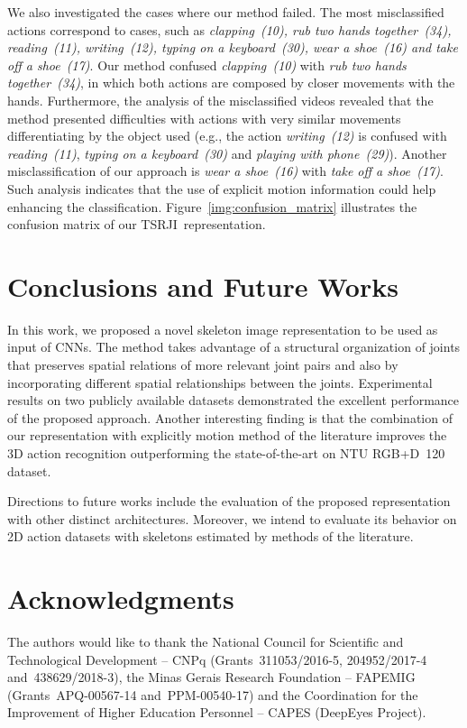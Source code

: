 \documentclass[10pt,conference]{IEEEtran}
\def\sigla{TSRJI}
\begin{document}
We also investigated the cases where our method failed. The most misclassified actions correspond to cases, such as \emph{clapping~(10), rub two hands together~(34), reading~(11), writing~(12), typing on a keyboard~(30), wear a shoe~(16) and take off a shoe~(17)}. Our method confused \emph{clapping~(10)} with \emph{rub two hands together~(34)}, in which both actions are composed by closer movements with the hands. Furthermore, the analysis of the misclassified videos revealed that the method presented difficulties with actions with very similar movements differentiating by the object used (e.g., the action \emph{writing~(12)} is confused with \emph{reading~(11)}, \emph{typing on a keyboard~(30)} and \emph{playing with phone~(29)}). Another misclassification of our approach is \emph{wear a shoe~(16)} with \emph{take off a shoe~(17)}. Such analysis indicates that the use of explicit motion information could help enhancing the classification. Figure~\ref{img:confusion_matrix} illustrates the confusion matrix of our \sigla~representation. 

\section{Conclusions and Future Works}\label{conclusions}

In this work, we proposed a novel skeleton image representation to be used as input of CNNs. The method takes advantage of a structural organization of joints that preserves spatial relations of more relevant joint pairs and also by incorporating different spatial relationships between the joints. Experimental results on two publicly available datasets demonstrated the excellent performance of the proposed approach. Another interesting finding is that the combination of our representation with explicitly motion method of the literature improves the 3D action recognition outperforming the state-of-the-art on NTU RGB+D~120 dataset.

Directions to future works include the evaluation of the proposed representation with other distinct architectures. Moreover, we intend to evaluate its behavior on 2D action datasets with skeletons estimated by methods of the literature.

\section*{Acknowledgments}

The authors would like to thank the National Council for Scientific and Technological Development -- CNPq (Grants~311053/2016-5, 204952/2017-4 and~438629/2018-3), the Minas Gerais Research Foundation -- FAPEMIG (Grants~APQ-00567-14 and~PPM-00540-17) and the Coordination for the Improvement of Higher Education Personnel -- CAPES (DeepEyes Project).







\balance

\end{document}

